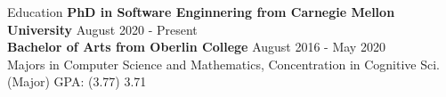 \documentclass{resume}
\begin{document}
\begin{rSection}{Education}
{\bf PhD in Software Enginnering from Carnegie Mellon University} \hfill { August 2020 - Present} \\ 
{\bf Bachelor of Arts from Oberlin College} \hfill { August 2016 - May 2020} \\
Majors in Computer Science and Mathematics, Concentration in Cognitive Sci. \hfill {(Major) GPA: (3.77) 3.71}
\end{rSection}
\end{document}
